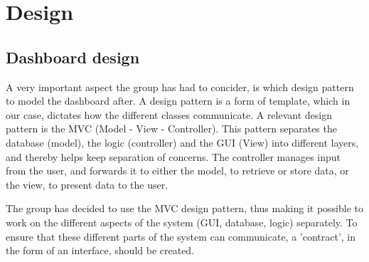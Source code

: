\section{Design}

\subsection{Dashboard design}
A very important aspect the group has had to concider, is which design pattern
to model the dashboard after. A design pattern is a form of template, which in
our case, dictates how the different classes communicate. A relevant design
pattern is the MVC (Model - View - Controller). This pattern separates the
database (model), the logic (controller) and the GUI (View) into different
layers, and thereby helps keep separation of concerns. The controller manages
input from the user, and forwards it to either the model, to retrieve or store
data, or the view, to present data to the user.

The group has decided to use the MVC design pattern, thus making it possible to
work on the different aspects of the system (GUI, database, logic) separately.
To ensure that these different parts of the system can communicate, a 'contract',
in the form of an interface, should be created.